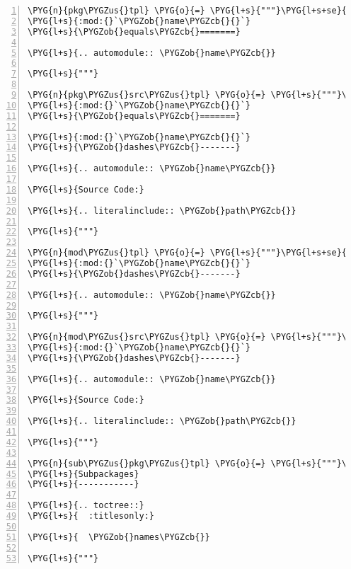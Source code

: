 \begin{Verbatim}[commandchars=\\\{\},numbers=left,firstnumber=1,stepnumber=5]
\PYG{n}{pkg\PYGZus{}tpl} \PYG{o}{=} \PYG{l+s}{"""}\PYG{l+s+se}{\PYGZbs{}}
\PYG{l+s}{:mod:{}`\PYGZob{}name\PYGZcb{}{}`}
\PYG{l+s}{\PYGZob{}equals\PYGZcb{}=======}

\PYG{l+s}{.. automodule:: \PYGZob{}name\PYGZcb{}}

\PYG{l+s}{"""}

\PYG{n}{pkg\PYGZus{}src\PYGZus{}tpl} \PYG{o}{=} \PYG{l+s}{"""}\PYG{l+s+se}{\PYGZbs{}}
\PYG{l+s}{:mod:{}`\PYGZob{}name\PYGZcb{}{}`}
\PYG{l+s}{\PYGZob{}equals\PYGZcb{}=======}

\PYG{l+s}{:mod:{}`\PYGZob{}name\PYGZcb{}{}`}
\PYG{l+s}{\PYGZob{}dashes\PYGZcb{}-------}

\PYG{l+s}{.. automodule:: \PYGZob{}name\PYGZcb{}}

\PYG{l+s}{Source Code:}

\PYG{l+s}{.. literalinclude:: \PYGZob{}path\PYGZcb{}}

\PYG{l+s}{"""}

\PYG{n}{mod\PYGZus{}tpl} \PYG{o}{=} \PYG{l+s}{"""}\PYG{l+s+se}{\PYGZbs{}}
\PYG{l+s}{:mod:{}`\PYGZob{}name\PYGZcb{}{}`}
\PYG{l+s}{\PYGZob{}dashes\PYGZcb{}-------}

\PYG{l+s}{.. automodule:: \PYGZob{}name\PYGZcb{}}

\PYG{l+s}{"""}

\PYG{n}{mod\PYGZus{}src\PYGZus{}tpl} \PYG{o}{=} \PYG{l+s}{"""}\PYG{l+s+se}{\PYGZbs{}}
\PYG{l+s}{:mod:{}`\PYGZob{}name\PYGZcb{}{}`}
\PYG{l+s}{\PYGZob{}dashes\PYGZcb{}-------}

\PYG{l+s}{.. automodule:: \PYGZob{}name\PYGZcb{}}

\PYG{l+s}{Source Code:}

\PYG{l+s}{.. literalinclude:: \PYGZob{}path\PYGZcb{}}

\PYG{l+s}{"""}

\PYG{n}{sub\PYGZus{}pkg\PYGZus{}tpl} \PYG{o}{=} \PYG{l+s}{"""}\PYG{l+s+se}{\PYGZbs{}}
\PYG{l+s}{Subpackages}
\PYG{l+s}{-----------}

\PYG{l+s}{.. toctree::}
\PYG{l+s}{	:titlesonly:}

\PYG{l+s}{	\PYGZob{}names\PYGZcb{}}

\PYG{l+s}{"""}
\end{Verbatim}



